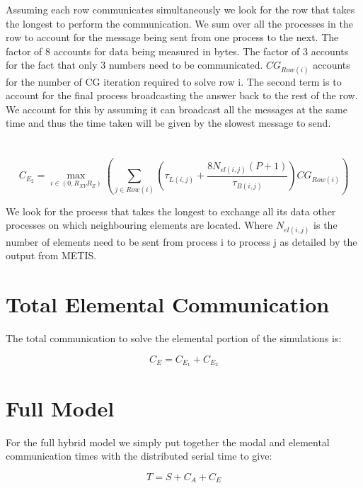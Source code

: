 Assuming each row communicates simultaneously we look for the row that takes the longest to perform the communication. We sum over all the processes in the row to account for the message being sent from one process to the next. The factor of 8 accounts for data being measured in bytes. The factor of 3 accounts for the fact that only 3 numbers need to be communicated. \(CG_{Row(i)}\) accounts for the number of CG iteration required to solve row i. The second term is to account for the final process broadcasting the answer back to the rest of the row. We account for this by assuming it can broadcast all the messages at the same time and thus the time taken will be given by the slowest message to send.

\section{}
\begin{equation}
C_{E_2} =\max_{i \in (0, R_{XY} R_Z)} \left( \sum_{j \in Row(i)} \left(\tau_{L(i,j)} + \frac{8N_{el(i,j)}(P+1)}{\tau_{B(i,j)}} \right) CG_{Row(i)}\right)
\end{equation}

We look for the process that takes the longest to exchange all its data other processes on which neighbouring elements are located. Where \(N_{el(i,j)}\) is the number of elements need to be sent from process i to process j as detailed by the output from METIS. 

\section{Total Elemental Communication}
The total communication to solve the elemental portion of the simulations is: 

\begin{equation}
C_E = C_{E_1} + C_{E_2}
\end{equation}

\section{Full Model}
For the full hybrid model we simply put together the modal and elemental communication times with the distributed serial time to give:

\begin{equation}
T = S + C_A + C_E
\end{equation}





